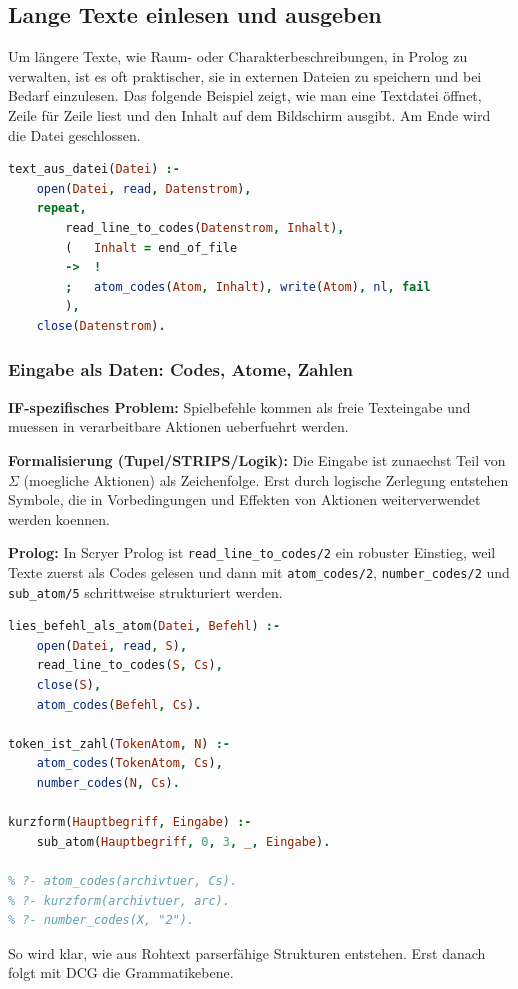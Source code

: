 \documentclass[parskip=half,a4paper,11pt]{scrreprt}
\begin{document}
\subsection{Lange Texte einlesen und ausgeben}

Um längere Texte, wie Raum- oder Charakterbeschreibungen, in Prolog zu verwalten, ist es oft praktischer, sie in externen Dateien zu speichern und bei Bedarf einzulesen. Das folgende Beispiel zeigt, wie man eine Textdatei öffnet, Zeile für Zeile liest und den Inhalt auf dem Bildschirm ausgibt. Am Ende wird die Datei geschlossen.
\begin{lstlisting}[language=Prolog, caption={}]
text_aus_datei(Datei) :-
    open(Datei, read, Datenstrom),
    repeat,
        read_line_to_codes(Datenstrom, Inhalt),
        (   Inhalt = end_of_file
        ->  !
        ;   atom_codes(Atom, Inhalt), write(Atom), nl, fail
        ),
    close(Datenstrom).
\end{lstlisting}

\subsubsection{Eingabe als Daten: Codes, Atome, Zahlen}

\textbf{IF-spezifisches Problem:} Spielbefehle kommen als freie Texteingabe und muessen in verarbeitbare Aktionen ueberfuehrt werden.

\textbf{Formalisierung (Tupel/STRIPS/Logik):} Die Eingabe ist zunaechst Teil von $\Sigma$ (moegliche Aktionen) als Zeichenfolge. Erst durch logische Zerlegung entstehen Symbole, die in Vorbedingungen und Effekten von Aktionen weiterverwendet werden koennen.

\textbf{Prolog:} In Scryer Prolog ist \texttt{read\_line\_to\_codes/2} ein robuster Einstieg, weil Texte zuerst als Codes gelesen und dann mit \texttt{atom\_codes/2}, \texttt{number\_codes/2} und \texttt{sub\_atom/5} schrittweise strukturiert werden.
\begin{lstlisting}[language=Prolog, caption={}]
lies_befehl_als_atom(Datei, Befehl) :-
    open(Datei, read, S),
    read_line_to_codes(S, Cs),
    close(S),
    atom_codes(Befehl, Cs).

token_ist_zahl(TokenAtom, N) :-
    atom_codes(TokenAtom, Cs),
    number_codes(N, Cs).

kurzform(Hauptbegriff, Eingabe) :-
    sub_atom(Hauptbegriff, 0, 3, _, Eingabe).

% ?- atom_codes(archivtuer, Cs).
% ?- kurzform(archivtuer, arc).
% ?- number_codes(X, "2").
\end{lstlisting}
So wird klar, wie aus Rohtext parserfähige Strukturen entstehen. Erst danach folgt mit DCG die Grammatikebene.
\end{document}
